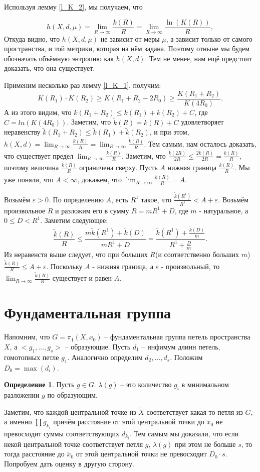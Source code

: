 \documentclass[11pt]{article}
\theoremstyle{definition}
\newtheorem{defin}{Определение}%
\theoremstyle{plain}
\theoremstyle{plain}
\def\leq{\leqslant}
\def\geq{\geqslant}
\def\wt#1{\widetilde{#1}}
\def\eps{\varepsilon}
\begin{document}
Используя лемму \ref{l_K_2}, мы получаем, что 

$$
	h(X, d, \mu) = \lim_{R \rightarrow \infty} \frac{k(R)} {R} = \lim_{R \rightarrow \infty} \frac{\ln (K(R))} {R},
$$
Откуда видно, что $h(X, d, \mu)$ не зависит от меры $\mu$, а зависит только от самого пространства, и той метрики, которая на нём задана.
Поэтому отныне мы будем обозначать объёмную энтропию как $h(X, d)$.
Тем не менее, нам ещё предстоит доказать, что она существует.

Применим несколько раз лемму \ref{l_K_1}, получим:
$$
  K(R_1) \cdot K(R_2) \geq K(R_1 + R_2 - 2 R_0) \geq \frac{K(R_1 + R_2)}{K(4 R_0)}.
$$
А из этого видим, что $k(R_1 + R_2) \leq k(R_1) + k(R_2) + C$, где $C = ln(K(4 R_0))$.
Заметим, что $\wt{k}(R) = k(R) + C$ удовлетворяет неравенству $\wt{k}(R_1 + R_2) \leq \wt{k}(R_1) + \wt{k}(R_2)$, и при этом,
$h(X,d) = \lim_{R \rightarrow \infty} \frac{k(R)}{R} = \lim_{R \rightarrow \infty} \frac{\wt{k}(R)}{R}$.
Тем самым, нам осталось доказать, что существует предел $\lim_{R \rightarrow \infty} \frac{\wt{k}(R)}{R}$.
Заметим, что $\frac{\wt{k}(2R)}{2R} \leq \frac{2\wt{k}(R)}{2R} = \frac{\wt{k}(R)}{R}$, поэтому величина $\frac{\wt{k}(R)}{R}$ ограничена сверху.
Пусть $A$ нижняя граница $\frac{\wt{k}(R)}{R}$. Мы уже поняли, что $A < \infty$, докажем, что $\lim_{R \rightarrow \infty} \frac{\wt{k}(R)}{R} = A$.

Возьмём $\eps > 0$. По определению $A$, есть $R^1$ такое, что $\frac{\wt{k}(R^1)}{R^1} < A + \eps$. 
Возьмём произвольное $R$ и разложим его в сумму $R = m R^1 + D$, где $m$ - натуральное, а $0 \leq D < R^1$. 
Заметим следующее:
$$
\frac{\wt{k}(R)}{R} \leq 
\frac{m \wt{k}(R^1) + \wt{k}(D)}{m R^1 + D} =
\frac{\wt{k}(R^1) + \frac{\wt{k}(D)}{m}}{R^1 + \frac{D}{m}} .
$$
Из неравенств выше следует, что при больших $R$(и соответственно больших $m$) $\frac{\wt{k}(R)}{R} \leq A + \eps$. 
Поскольку $A$ - нижняя граница, а $\eps$ - произвольный, то $\lim_{R \rightarrow \infty} \frac{\wt{k}(R)}{R}$ существует и равен $A$.




\section{Фундаментальная группа}
Напомним, что $G = \pi_1(X, x_0)$ -- фундаментальная группа петель пространства $X$, а $<g_1,\dots,g_s>$ -- образующие.
Пусть $d_1$ -- инфимум длинн петель, гомотопных петле $g_1$. Аналогично определим $d_2,\dots,d_s$.
Положим $D_0 = \max(d_i)$.
\begin{defin}
Пусть $g \in G$. $\lambda(g)$ -- это количество $g_i$ в минимальном разложении $g$ по образующим.
\end{defin}
Заметим, что каждой центральной точке из $\wt{X}$ соответствует какая-то петля из $G$, а именно $\prod g_{k_i}$ 
причём расстояние от этой центральной точки до $\wt{x}_0$ не превосходит суммы соответствующих $d_{k_i}$. 
Тем самым мы доказали, что если некой центральной точке соответствует петля $g$,
$\lambda(g)$ при этом не больше $s$, то тогда расстояние до $\wt{x}_0$ от этой центральной точки не превосходит $D_0 \cdot s$.
Попробуем дать оценку в другую сторону.
\end{document}
